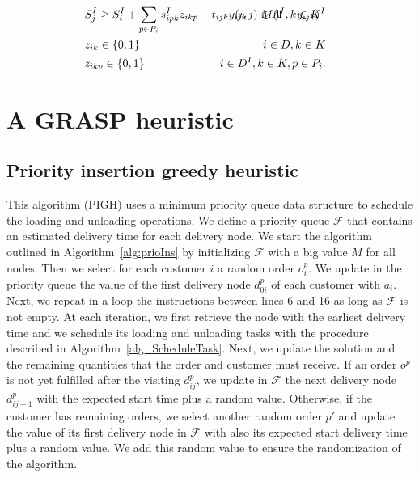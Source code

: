 \documentclass{article}
\newcommand{\F}{$\mathcal{F}$\xspace}
\begin{document}
{\begin{align}
    \label{c54} & \hspace{2mm} S^I_j \geq \hspace{-0mm} S^I_{i} + \sum_{p \in P_i}s_{ipk}^I z_{ikp} + t_{ijk}y_{ijk} - M(1-y_{ijk})  & \hspace{-30mm}  (i,j) \in A^I, k \in K^{I} \hspace{5mm} \\
    \label{c61} & \hspace{2mm} z_{ik} \in \{0,1\} & \hspace{-50mm}  i \in D , k \in K  \hspace{5mm} \\
    \label{cend2} & \hspace{2mm} z_{ikp} \in \{0,1\} & \hspace{-50mm} i \in D^I , k \in K, p \in P_i.  \hspace{5mm}
\end{align}
\fi

\section{A GRASP heuristic}
\label{method}

\subsection{Priority insertion greedy heuristic}
This algorithm (PIGH) uses a minimum priority queue data structure to schedule the loading and unloading operations. We define a priority queue \F that contains an estimated delivery time for each delivery node. We start the algorithm outlined in Algorithm~\ref{alg:prioIns} by initializing \F with a big value $M$ for all nodes. Then we select for each customer $i$ a random order $o^p_i$. We update in the priority queue the value of the first delivery node $d^p_{0i}$ of each customer with $a_i$. Next, we repeat in a loop the instructions between lines 6 and 16 as long as \F is not empty. At each iteration, we first retrieve the node with the earliest delivery time and we schedule its loading and unloading tasks with the procedure described in Algorithm~\ref{alg_ScheduleTask}. Next, we update the solution and the remaining quantities that the order and customer must receive. If an order $o^p$ is not yet fulfilled after the visiting $d^p_{ij}$, we update in \F the next delivery node $d^p_{ij+1}$ with the expected start time plus a random value. Otherwise, if the customer has remaining orders, we select another random order $p'$ and update the value of its first delivery node in \F with also its expected start delivery time plus a random value. We add this random value to ensure the randomization of the algorithm.

}
\end{document}
